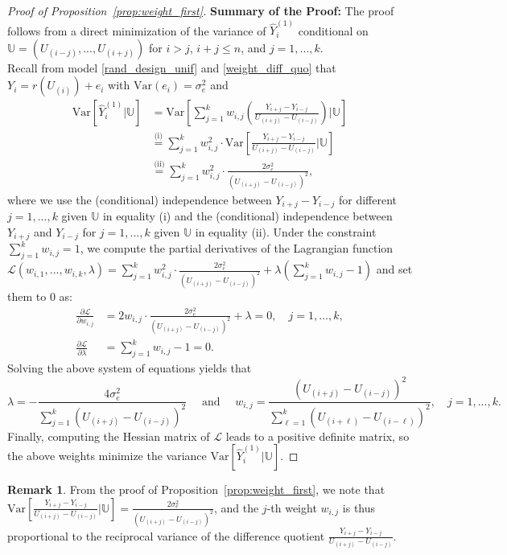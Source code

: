 \documentclass{uwstat572}
\theoremstyle{definition}
\newtheorem{Remark}{Remark}
\renewcommand{\hat}{\widehat}
\theoremstyle{theorem}
\begin{document}
\begin{proof}[Proof of Proposition~\ref{prop:weight_first}]
{\bf Summary of the Proof:} The proof follows from a direct minimization of the variance of $\hat{Y}_i^{(1)}$ conditional on $\mathbb{U} = \left(U_{(i-j)},...,U_{(i+j)}\right)$ for $i>j$, $i+j\leq n$, and $j=1,...,k$. \\

Recall from model \eqref{rand_design_unif} and \eqref{weight_diff_quo} that $Y_i=r(U_{(i)}) + e_i$ with $\mathrm{Var}(e_i)=\sigma_e^2$ and
\begin{align*}
\mathrm{Var}\left[\hat{Y}_i^{(1)} \big| \mathbb{U}\right] &= \mathrm{Var}\left[\sum_{j=1}^k w_{i,j} \left(\frac{Y_{i+j} - Y_{i-j}}{U_{(i+j)} - U_{(i-j)}}\right) \Big| \mathbb{U} \right]\\
&\stackrel{\text{(i)}}{=} \sum_{j=1}^k w_{i,j}^2 \cdot \mathrm{Var}\left[\frac{Y_{i+j} - Y_{i-j}}{U_{(i+j)} - U_{(i-j)}} \Big| \mathbb{U} \right] \\
&\stackrel{\text{(ii)}}{=} \sum_{j=1}^k w_{i,j}^2\cdot  \frac{2\sigma_e^2}{\left(U_{(i+j)} - U_{(i-j)}\right)^2},
\end{align*}
where we use the (conditional) independence between $Y_{i+j} - Y_{i-j}$ for different $j=1,...,k$ given $\mathbb{U}$ in equality (i) and the (conditional) independence between $Y_{i+j}$ and $Y_{i-j}$ for $j=1,...,k$ given $\mathbb{U}$ in equality (ii). Under the constraint $\sum_{j=1}^k w_{i,j}=1$, we compute the partial derivatives of the Lagrangian function $\mathcal{L}(w_{i,1},...,w_{i,k},\lambda) = \sum_{j=1}^k w_{i,j}^2\cdot  \frac{2\sigma_e^2}{\left(U_{(i+j)} - U_{(i-j)}\right)^2} + \lambda \left(\sum_{j=1}^k w_{i,j}-1\right)$ and set them to 0 as:
\begin{align*}
\frac{\partial \mathcal{L}}{\partial w_{i,j}} &= 2w_{i,j} \cdot \frac{2\sigma_e^2}{\left(U_{(i+j)} - U_{(i-j)}\right)^2} + \lambda = 0, \quad j=1,...,k,\\
\frac{\partial \mathcal{L}}{\partial \lambda} &= \sum_{j=1}^k w_{i,j}-1=0.
\end{align*}
Solving the above system of equations yields that
$$\lambda = -\frac{4\sigma_e^2}{\sum_{j=1}^k \left(U_{(i+j)} - U_{(i-j)}\right)^2} \quad \text{ and } \quad w_{i,j} = \frac{\left(U_{(i+j)} - U_{(i-j)}\right)^2}{\sum_{\ell=1}^k \left(U_{(i+\ell)} - U_{(i-\ell)}\right)^2}, \quad j=1,...,k.$$
Finally, computing the Hessian matrix of $\mathcal{L}$ leads to a positive definite matrix, so the above weights minimize the variance $\mathrm{Var}\left[\hat{Y}_i^{(1)} \big| \mathbb{U}\right]$. 
\end{proof}

\begin{Remark}
From the proof of Proposition~\ref{prop:weight_first}, we note that $\mathrm{Var}\left[\frac{Y_{i+j} - Y_{i-j}}{U_{(i+j)} - U_{(i-j)}} \Big| \mathbb{U} \right] = \frac{2\sigma_e^2}{\left(U_{(i+j)} - U_{(i-j)}\right)^2}$, and the $j$-th weight $w_{i,j}$ is thus proportional to the reciprocal variance of the difference quotient $\frac{Y_{i+j} - Y_{i-j}}{U_{(i+j)} - U_{(i-j)}}$.
\end{Remark}
\end{document}
